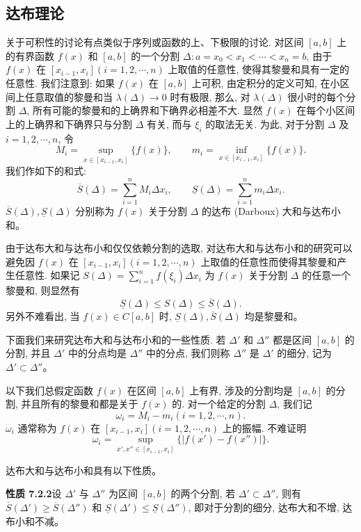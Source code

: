 \documentclass[UTF8,12pt,a4paper,fontset=fandol]{ctexart}
\begin{document}
\subsection{达布理论}

关于可积性的讨论有点类似于序列或函数的上、下极限的讨论. 对区间 $[a,b]$ 上的有界函数 $f(x)$ 和 $[a,b]$ 的一个分割 $\Delta:a=x_0<x_1<\cdots<x_n=b$, 由于 $f(x)$ 在 $[x_{i-1},x_i](i=1,2,\cdots,n)$ 上取值的任意性, 使得其黎曼和具有一定的任意性. 我们注意到: 如果 $f(x)$ 在 $[a,b]$ 上可积, 由定积分的定义可知, 在小区间上任意取值的黎曼和当 $\lambda(\Delta)\to0$ 时有极限, 那么, 对 $\lambda(\Delta)$ 很小时的每个分割 $\Delta$, 所有可能的黎曼和的上确界和下确界必相差不大. 显然 $f(x)$ 在每个小区间上的上确界和下确界只与分割 $\Delta$ 有关, 而与 $\xi_i$ 的取法无关. 为此, 对于分割 $\Delta$ 及 $i=1,2,\cdots,n$, 令
\[
  M_i=\sup_{x\in[x_{i-1},x_i]}\{f(x)\},\qquad
  m_i=\inf_{x\in[x_{i-1},x_i]}\{f(x)\}.
\]
我们作如下的和式:
\[
  \overline S(\Delta)=\sum_{i=1}^n M_i\Delta x_i,\qquad
  \underline S(\Delta)=\sum_{i=1}^n m_i\Delta x_i.
\]
$\overline S(\Delta),\underline S(\Delta)$ 分别称为 $f(x)$ 关于分割 $\Delta$ 的达布 (Darboux) 大和与达布小和。

由于达布大和与达布小和仅仅依赖分割的选取, 对达布大和与达布小和的研究可以避免因 $f(x)$ 在 $[x_{i-1},x_i](i=1,2,\cdots,n)$ 上取值的任意性而使得其黎曼和产生任意性. 如果记 $S(\Delta)=\sum\limits_{i=1}^n f(\xi_i)\Delta x_i$ 为 $f(x)$ 关于分割 $\Delta$ 的任意一个黎曼和, 则显然有
\[
  \underline S(\Delta)\leq S(\Delta)\leq \overline S(\Delta).
\]
另外不难看出, 当 $f(x)\in C[a,b]$ 时, $\underline S(\Delta),\overline S(\Delta)$ 均是黎曼和。

下面我们来研究达布大和与达布小和的一些性质. 若 $\Delta'$ 和 $\Delta''$ 都是区间 $[a,b]$ 的分割, 并且 $\Delta'$ 中的分点均是 $\Delta''$ 中的分点, 我们则称 $\Delta''$ 是 $\Delta'$ 的细分, 记为 $\Delta'\subset\Delta''$。

以下我们总假定函数 $f(x)$ 在区间 $[a,b]$ 上有界, 涉及的分割均是 $[a,b]$ 的分割, 并且所有的黎曼和都是关于 $f(x)$ 的. 对一个给定的分割 $\Delta$, 我们记
\[
  \omega_i=M_i-m_i(i=1,2,\cdots,n).
\]
$\omega_i$ 通常称为 $f(x)$ 在 $[x_{i-1},x_i](i=1,2,\cdots,n)$ 上的振幅. 不难证明
\[
  \omega_i=\sup_{x',x''\in[x_{i-1},x_i]}\{|f(x')-f(x'')|\}.
\]

达布大和与达布小和具有以下性质。

\noindent\textbf{性质 7.2.2}\quad 设 $\Delta'$ 与 $\Delta''$ 为区间 $[a,b]$ 的两个分割, 若 $\Delta'\subset\Delta''$, 则有 $\overline S(\Delta')\geq\overline S(\Delta'')$ 和 $\underline S(\Delta')\leq\underline S(\Delta'')$, 即对于分割的细分, 达布大和不增, 达布小和不减。
\end{document}
